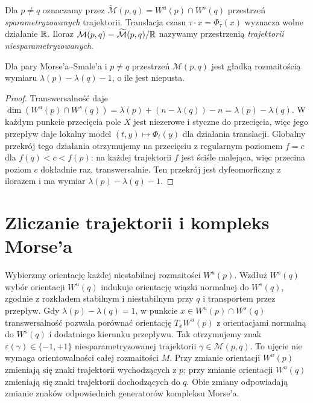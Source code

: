 Dla $p\ne q$ oznaczamy przez
$\widetilde{\mathcal M}(p,q)=W^u(p)\cap W^s(q)$
przestrzeń \emph{sparametryzowanych} trajektorii. Translacja czasu
$\tau\cdot x=\Phi_\tau(x)$ wyznacza wolne działanie $\mathbb{R}$.
Iloraz $\mathcal M(p,q)=\widetilde{\mathcal M}(p,q)/\mathbb{R}$
nazywamy przestrzenią \emph{trajektorii niesparametryzowanych}.

\begin{stwierdzenie}
\label{prop:morse-dimension-v10}
Dla pary Morse'a--Smale'a i $p\ne q$ przestrzeń
$\mathcal M(p,q)$ jest gładką rozmaitością wymiaru
$\lambda(p)-\lambda(q)-1$, o ile jest niepusta.
\end{stwierdzenie}
\begin{proof}
Transwersalność daje
$\dim(W^u(p)\cap W^s(q))=\lambda(p)+(n-\lambda(q))-n
=\lambda(p)-\lambda(q)$.
W każdym punkcie przecięcia pole $X$ jest niezerowe i styczne do
przecięcia, więc jego przepływ daje lokalny model
$(t,y)\mapsto\Phi_t(y)$ dla działania translacji.
Globalny przekrój tego działania otrzymujemy na przecięciu z
regularnym poziomem $f=c$ dla $f(q)<c<f(p)$:
na każdej trajektorii $f$ jest ściśle malejąca, więc przecina
poziom $c$ dokładnie raz, transwersalnie.
Ten przekrój jest dyfeomorficzny z ilorazem i ma wymiar
$\lambda(p)-\lambda(q)-1$.
\end{proof}

\section{Zliczanie trajektorii i kompleks Morse'a}
Wybierzmy orientację każdej niestabilnej rozmaitości $W^u(p)$.
Wzdłuż $W^s(q)$ wybór orientacji $W^u(q)$ indukuje orientację wiązki
normalnej do $W^s(q)$, zgodnie z rozkładem stabilnym i niestabilnym
przy $q$ i transportem przez przepływ. Gdy $\lambda(p)-\lambda(q)=1$,
w punkcie $x\in W^u(p)\cap W^s(q)$ transwersalność pozwala porównać
orientację $T_xW^u(p)$ z orientacjami normalną do $W^s(q)$
i dodatniego kierunku przepływu. Tak otrzymujemy znak
$\varepsilon(\gamma)\in\{-1,+1\}$ niesparametryzowanej
trajektorii $\gamma\in\mathcal M(p,q)$. To ujęcie nie wymaga
orientowalności całej rozmaitości $M$. Przy zmianie orientacji
$W^u(p)$ zmieniają się znaki trajektorii wychodzących z $p$;
przy zmianie orientacji $W^u(q)$ zmieniają się znaki trajektorii
dochodzących do $q$. Obie zmiany odpowiadają zmianie znaków
odpowiednich generatorów kompleksu Morse'a.

